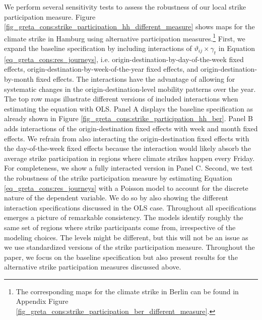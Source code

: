 We perform several sensitivity tests to assess the robustness of our local strike participation measure. Figure \ref{fig_greta_cons:strike_participation_hh_different_measure} shows maps for the climate strike in Hamburg using alternative participation measures.\footnote{The corresponding maps for the climate strike in Berlin can be found in Appendix Figure \ref{fig_greta_cons:strike_participation_ber_different_measure}.} First, we expand the baseline specification by including interactions of $\vartheta_{ij}\times\gamma_t$ in Equation \ref{eq_greta_cons:res_journeys}, i.e. origin-destination-by-day-of-the-week fixed effects, origin-destination-by-week-of-the-year fixed effects, and origin-destination-by-month fixed effects. The interactions have the advantage of allowing for systematic changes in the origin-destination-level mobility patterns over the year. The top row maps illustrate different versions of included interactions when estimating the equation with OLS. Panel A displays the baseline specification as already shown in Figure \ref{fig_greta_cons:strike_participation_hh_ber}. Panel B adds interactions of the origin-destination fixed effects with week and month fixed effects. We refrain from also interacting the origin-destination fixed effects with the day-of-the-week fixed effects because the interaction would likely absorb the average strike participation in regions where climate strikes happen every Friday. For completeness, we show a fully interacted version in Panel C. Second, we test the robustness of the strike participation measure by estimating Equation \ref{eq_greta_cons:res_journeys} with a Poisson model to account for the discrete nature of the dependent variable. We do so by also showing the different interaction specifications discussed in the OLS case. Throughout all specifications emerges a picture of remarkable consistency. The models identify roughly the same set of regions where strike participants come from, irrespective of the modeling choices. The levels might be different, but this will not be an issue as we use standardized versions of the strike participation measure. Throughout the paper, we focus on the baseline specification but also present results for the alternative strike participation measures discussed above.



